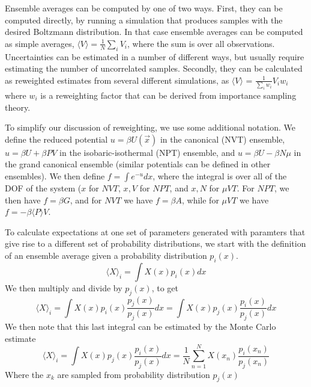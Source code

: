 \documentclass[9pt,bestpractices]{livecoms}
\begin{document}
Ensemble averages can be computed by one of two ways. First, they can
be computed directly, by running a simulation that produces samples
with the desired Boltzmann distribution.  In that case ensemble 
averages can be computed as simple averages, ${\langle {V} \rangle} =
\frac{1}{N}\sum_i V_i$, where the sum is over all observations.
Uncertainties can be estimated in a number of different ways, but
usually require estimating the number of uncorrelated
samples. Secondly, they can be calculated as reweighted estimates from
several different simulations, as ${\langle {V} \rangle}$ =
$\frac{1}{\sum_i w_i} V_i w_i$ where $w_i$ is a reweighting factor
that can be derived from importance sampling theory. 

To simplify our discussion of reweighting, we use some additional
notation.  We define the reduced potential $u = \beta U(\vec{x})$ in
the canonical (NVT) ensemble, $u = \beta U + \beta PV$ in the
isobaric-isothermal (NPT) ensemble, and $u = \beta U - \beta N\mu$ in
the grand canonical ensemble (similar potentials can be defined in
other ensembles). We then define $f = \int e^{-u} dx$, where the
integral is over all of the DOF of the system ($x$ for $NVT$, $x,V$ for
$NPT$, and $x,N$ for $\mu VT$.  For $NPT$, we then have $f = \beta G$, and for $NVT$
we have $f = \beta A$, while for $\mu V T$ we have $f = -\beta \langle
P \rangle V$.

To calculate expectations at one set of parameters generated with
paramters that give rise to a different set of probability
distributions, we start with the definition of an ensemble average
given a probability distribution $p_i(x)$. 
\begin{equation}
\langle X \rangle_i = \int X(x) p_i(x) dx 
\end{equation}
We then multiply and divide by $p_j(x)$, to get
\begin{equation}
\langle X \rangle_i = \int X(x) p_i(x) \frac{p_j(x)}{p_j(x)}dx = \int X(x) p_j(x) \frac{p_i(x)}{p_j(x)}dx 
\end{equation}
We then note that this last integral can be estimated by the Monte Carlo estimate
\begin{equation}
\langle X \rangle_i = \int X(x) p_j(x) \frac{p_i(x)}{p_j(x)}dx = \frac{1}{N}\sum_{n=1}^N X(x_n) \frac{p_i(x_n)}{p_j(x_n)}
\end{equation}
Where the $x_k$ are sampled from probability distribution $p_j(x)$
\end{document}
